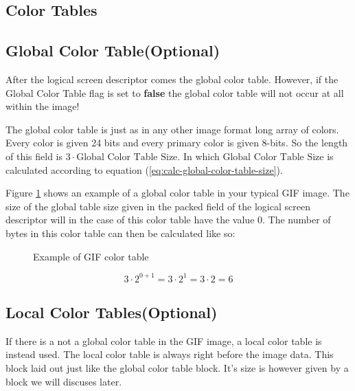 \begin{refsection}
  \section{Color Tables}

  \subsection{Global Color Table(Optional)}

  After the logical screen descriptor comes the global color
  table. However, if the Global Color Table flag is set to
  \textbf{false} the global color table will not occur at all within
  the image!

  The global color table is just as in any other image format long
  array of colors. Every color is given 24 bits and every primary
  color is given 8-bits. So the length of this field is $3 \cdot
  \textrm{Global Color Table Size}$. In which $\textrm{Global Color
    Table Size}$ is calculated according to equation
  (\ref{eq:calc-global-color-table-size}).

  Figure \ref{fig:gif-color-table} shows an example of a global color
  table in your typical GIF image. The size of the global table size
  given in the packed field of the logical screen descriptor will in
  the case of this color table have the value $0$. The number of bytes
  in this color table can then be calculated like so:


  \begin{figure}
    \centering
    \caption{Example of GIF color table }
    \label{fig:gif-color-table}
  \end{figure}

  \begin{equation*}
    3 \cdot 2^{0 +1} = 3 \cdot 2^1 = 3 \cdot 2 = 6
  \end{equation*}

  \subsection{Local Color Tables(Optional)}

  If there is a not a global color table in the GIF image, a local
  color table is instead used. The local color table is always right
  before the image data. This block laid out just like the global
  color table block. It's size is however given by a block we will discuses
  later.


\end{refsection}

